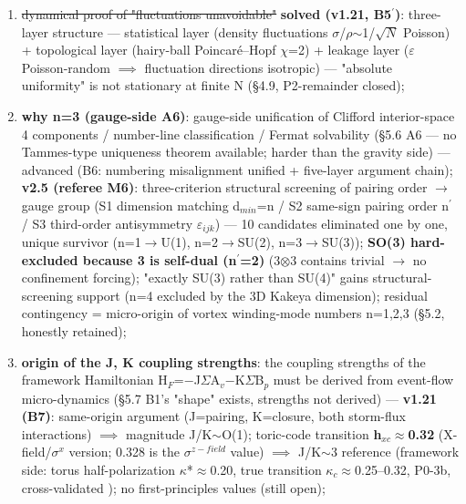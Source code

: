 \documentclass[12pt]{article}
\newcommand{\up}[1]{\ensuremath{^{#1}}}
\newcommand{\down}[1]{\ensuremath{_{#1}}}
\begin{document}
\begin{enumerate}
\item \sout{dynamical proof of "fluctuations unavoidable"} \textbf{\checkmark solved (v1.21, B5\ensuremath{^\prime})}: three-layer structure --- statistical layer (density fluctuations \ensuremath{\sigma}/\ensuremath{\rho}\ensuremath{\sim}1/\ensuremath{\sqrt{N}} Poisson) + topological layer (hairy-ball Poincar\'{e}--Hopf \ensuremath{\chi}=2) + leakage layer (\ensuremath{\varepsilon} Poisson-random \ensuremath{\implies} fluctuation directions isotropic) --- "absolute uniformity" is not stationary at finite N (\S{}4.9, P2-remainder closed);
\item \textbf{why n=3 (gauge-side A6)}: gauge-side unification of Clifford interior-space 4 components / number-line classification / Fermat solvability (\S{}5.6 A6 --- no Tammes-type uniqueness theorem available; harder than the gravity side) --- \checkmark advanced (B6: numbering misalignment unified + five-layer argument chain); \textbf{v2.5 (referee M6)}: three-criterion structural screening of pairing order \ensuremath{\to} gauge group (S1 dimension matching d\down{min}=n / S2 same-sign pairing order n\ensuremath{^\prime} / S3 third-order antisymmetry \ensuremath{\varepsilon}\down{ijk}) --- 10 candidates eliminated one by one, unique survivor (n=1\ensuremath{\to}U(1), n=2\ensuremath{\to}SU(2), n=3\ensuremath{\to}SU(3)); \textbf{SO(3) hard-excluded because 3 is self-dual (n\ensuremath{^\prime}=2)} (3\ensuremath{\otimes}3 contains trivial \ensuremath{\to} no confinement forcing); "exactly SU(3) rather than SU(4)" gains structural-screening support (n=4 excluded by the 3D Kakeya dimension); residual contingency = micro-origin of vortex winding-mode numbers n=1,2,3 (\S{}5.2, honestly retained);
\item \textbf{origin of the J, K coupling strengths}: the coupling strengths of the framework Hamiltonian H\down{F}=\ensuremath{-}J\ensuremath{\Sigma}A\down{v}\ensuremath{-}K\ensuremath{\Sigma}B\down{p} must be derived from event-flow micro-dynamics (\S{}5.7 B1's "shape" exists, strengths not derived) --- \textbf{v1.21 (B7)}: same-origin argument (J=pairing, K=closure, both storm-flux interactions) \ensuremath{\implies} magnitude J/K\ensuremath{\sim}O(1); toric-code transition \textbf{h\down{xc}\ensuremath{\approx}0.32} (X-field/\ensuremath{\sigma}\up{x} version; 0.328 is the \ensuremath{\sigma}\up{z-field} value) \ensuremath{\implies} J/K\ensuremath{\sim}3 reference (framework side: torus half-polarization \ensuremath{\kappa}*\ensuremath{\approx}0.20, true transition \ensuremath{\kappa}\down{c}\ensuremath{\approx}0.25--0.32, P0-3b, cross-validated \checkmark); no first-principles values (still open);

\end{enumerate}
\end{document}
